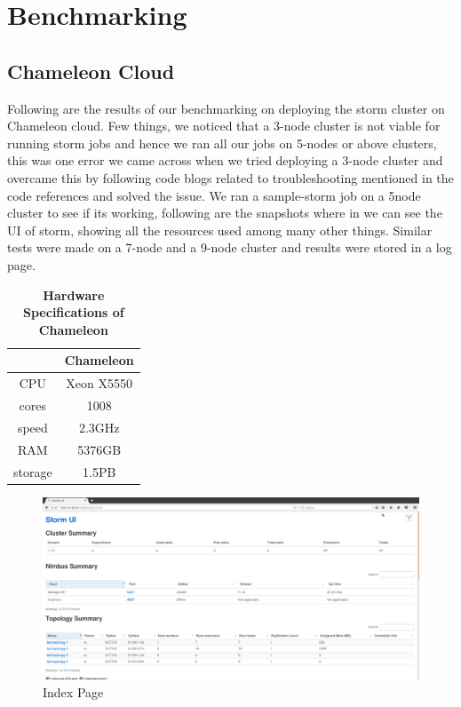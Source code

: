 \documentclass[9pt,twocolumn,twoside]{../../styles/osajnl}
\begin{document}
\section{Benchmarking}
\subsection{Chameleon Cloud}
Following are the results of our benchmarking on deploying the storm
cluster on Chameleon cloud. Few things, we noticed that a 3-node
cluster is not viable for running storm jobs and hence we ran all our
jobs on 5-nodes or above clusters, this was one error we came across
when we tried deploying a 3-node cluster and overcame this by
following code blogs related to troubleshooting mentioned in the code
references and solved the issue. We ran a sample-storm job on a 5node
cluster to see if its working, following are the snapshots where in we
can see the UI of storm, showing all the resources used among many
other things. Similar tests were made on a 7-node and a 9-node cluster
and results were stored in a log page.



\begin{table}[htbp]
\centering
\caption{\bf Hardware Specifications of Chameleon}

 \begin{tabular} {| c | c |}
\hline
  & Chameleon   \\ [0.5ex] 
 \hline

    
CPU   & Xeon X5550  \\
 \hline
cores & 1008   \\
 \hline
speed & 2.3GHz \\
 \hline
RAM   & 5376GB  \\
 \hline
storage & 1.5PB  \\ [1ex] 
 \hline

\end{tabular}
  \label{tab:cloud-comparison}
\end{table}

\begin{figure}[!htb]
  \includegraphics[width=\linewidth]{images/bench-1.png}
  \caption{Index Page}
  \label{Index Page}
\end{figure}
\end{document}
